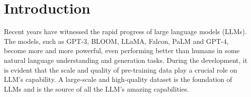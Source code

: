 \documentclass{article}
\begin{document}
\begin{abstract}
   
\end{abstract}

\section{Introduction}

Recent years have witnessed the rapid progress of large language models (LLMs). The models, such as GPT-3\cite{brown2020language}, BLOOM\cite{scao2022bloom}, LLaMA\cite{llama}, Falcon\cite{2023refinedweb}, PaLM\cite{chowdhery2022palm} and GPT-4\cite{GPT4}, become more and more powerful, even performing better than humans in some natural language understanding and generation tasks.  
During the development, it is evident that the scale and quality of pre-training data play a crucial role on LLM's capability. A large-scale and high-quality dataset is the foundation of LLMs and is the source of all the LLM's amazing capabilities.

    
\end{document}
